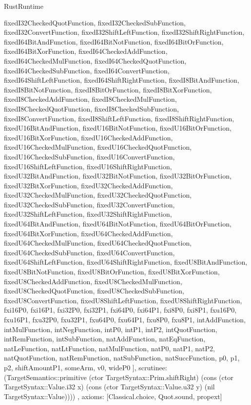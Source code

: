 \begin{lexlean}{RustRuntime}
\begin{semanticmodule}
{{      fixedI32CheckedQuotFunction,
      fixedI32CheckedSubFunction,
      fixedI32ConvertFunction,
      fixedI32ShiftLeftFunction,
      fixedI32ShiftRightFunction,
      fixedI64BitAndFunction,
      fixedI64BitNotFunction,
      fixedI64BitOrFunction,
      fixedI64BitXorFunction,
      fixedI64CheckedAddFunction,
      fixedI64CheckedMulFunction,
      fixedI64CheckedQuotFunction,
      fixedI64CheckedSubFunction,
      fixedI64ConvertFunction,
      fixedI64ShiftLeftFunction,
      fixedI64ShiftRightFunction,
      fixedI8BitAndFunction,
      fixedI8BitNotFunction,
      fixedI8BitOrFunction,
      fixedI8BitXorFunction,
      fixedI8CheckedAddFunction,
      fixedI8CheckedMulFunction,
      fixedI8CheckedQuotFunction,
      fixedI8CheckedSubFunction,
      fixedI8ConvertFunction,
      fixedI8ShiftLeftFunction,
      fixedI8ShiftRightFunction,
      fixedU16BitAndFunction,
      fixedU16BitNotFunction,
      fixedU16BitOrFunction,
      fixedU16BitXorFunction,
      fixedU16CheckedAddFunction,
      fixedU16CheckedMulFunction,
      fixedU16CheckedQuotFunction,
      fixedU16CheckedSubFunction,
      fixedU16ConvertFunction,
      fixedU16ShiftLeftFunction,
      fixedU16ShiftRightFunction,
      fixedU32BitAndFunction,
      fixedU32BitNotFunction,
      fixedU32BitOrFunction,
      fixedU32BitXorFunction,
      fixedU32CheckedAddFunction,
      fixedU32CheckedMulFunction,
      fixedU32CheckedQuotFunction,
      fixedU32CheckedSubFunction,
      fixedU32ConvertFunction,
      fixedU32ShiftLeftFunction,
      fixedU32ShiftRightFunction,
      fixedU64BitAndFunction,
      fixedU64BitNotFunction,
      fixedU64BitOrFunction,
      fixedU64BitXorFunction,
      fixedU64CheckedAddFunction,
      fixedU64CheckedMulFunction,
      fixedU64CheckedQuotFunction,
      fixedU64CheckedSubFunction,
      fixedU64ConvertFunction,
      fixedU64ShiftLeftFunction,
      fixedU64ShiftRightFunction,
      fixedU8BitAndFunction,
      fixedU8BitNotFunction,
      fixedU8BitOrFunction,
      fixedU8BitXorFunction,
      fixedU8CheckedAddFunction,
      fixedU8CheckedMulFunction,
      fixedU8CheckedQuotFunction,
      fixedU8CheckedSubFunction,
      fixedU8ConvertFunction,
      fixedU8ShiftLeftFunction,
      fixedU8ShiftRightFunction,
      fxi16P0,
      fxi16P1,
      fxi32P0,
      fxi32P1,
      fxi64P0,
      fxi64P1,
      fxi8P0,
      fxi8P1,
      fxu16P0,
      fxu16P1,
      fxu32P0,
      fxu32P1,
      fxu64P0,
      fxu64P1,
      fxu8P0,
      fxu8P1,
      intAddFunction,
      intMulFunction,
      intNegFunction,
      intP0,
      intP1,
      intP2,
      intQuotFunction,
      intRemFunction,
      intSubFunction,
      natAddFunction,
      natEqFunction,
      natLeFunction,
      natLtFunction,
      natMulFunction,
      natP0,
      natP1,
      natP2,
      natQuotFunction,
      natRemFunction,
      natSubFunction,
      natSuccFunction,
      p0,
      p1,
      p2,
      shiftAmountP1,
      someArm,
      v0,
      wideP0
    ],
    scrutinee: (TargetSemantics::primitive (ctor TargetSyntax::Prim.shiftRight) (cons (ctor TargetSyntax::Value.i32 x) (cons (ctor TargetSyntax::Value.u32 y) (nil TargetSyntax::Value))))
  },
  axioms: [Classical.choice, Quot.sound, propext]
}


\end{semanticmodule}
\end{lexlean}
